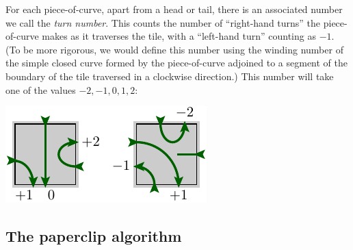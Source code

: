For each piece-of-curve, apart from a head or tail, there is an associated 
number we call the \emph{turn number}. This counts the number
of ``right-hand turns'' the piece-of-curve makes as it
traverses the tile, with a ``left-hand turn'' counting as $-1.$
(To be more rigorous, we would define this number using the
winding number of the simple closed curve formed by the
piece-of-curve adjoined to a segment of the boundary of the tile 
traversed in a clockwise direction.)
This number will take one of the values $-2, -1, 0, 1, 2:$
\begin{center}
\includegraphics[]{pic-cells-3.pdf}
\end{center}


%



%
%

\subsection{The paperclip algorithm}

